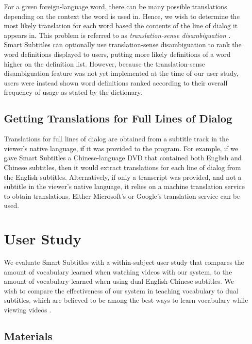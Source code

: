 \documentclass{sigchi}
\begin{document}
For a given foreign-language
word, there can be many possible translations depending on
the context the word is used in.
Hence, we wish to determine the most likely translation for each word
based the contents of the line of dialog it appears in.
This problem is referred to as \emph{translation-sense disambiguation}
\cite{translationsense}.
Smart Subtitles can optionally use translation-sense disambiguation
to rank the word definitions displayed to users, putting
more likely definitions of a word higher on the definition list.
However, because the translation-sense disambiguation feature was not yet implemented at the time of our user study, users were instead shown word definitions ranked according to their overall frequency of usage
as stated by the dictionary.

\subsection{Getting Translations for Full Lines of Dialog}

Translations for full lines of dialog are obtained from a subtitle track in the viewer's native language, if it was provided to 
the program. For example, if we gave Smart Subtitles a Chinese-language DVD
that contained both English and Chinese subtitles, then it would
extract translations for each line of dialog from the English subtitles.
Alternatively, if only a transcript was provided, and not a subtitle in the viewer's native language, it relies on a machine translation service to obtain translations. Either Microsoft's or Google's translation service can be used.

\section{User Study}

We evaluate Smart Subtitles with a within-subject user study that compares the amount of vocabulary learned when watching videos with our system, to the amount of vocabulary learned when using dual English-Chinese subtitles. We wish to compare the effectiveness of our system in teaching vocabulary to dual subtitles, which are believed to be among the best ways to learn vocabulary while viewing videos \cite{raine2012incidental}.

\subsection{Materials}
\end{document}
